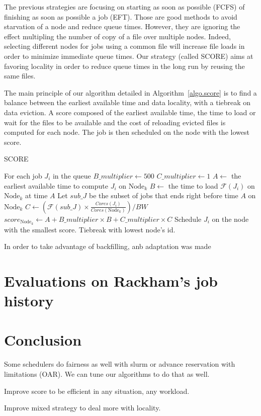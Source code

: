 \documentclass[conference,10pt]{IEEEtran}
\newcommand{\Node}[1]{\ensuremath{\mathrm{Node}_{#1}}\xspace}
\newcommand{\inputs}{\ensuremath{\mathcal{F}}\xspace}
\newcommand{\memory}{\ensuremath{\mathcal{M}}\xspace}
\newcommand{\bandwidth}{\mathit{BW}\xspace}
\newcommand{\core}{\mathit{Cores}\xspace}
\newcommand{\nodeset}{\ensuremath{\mathbb{N}}\xspace}
\begin{document}
The previous strategies are focusing on starting as soon as possible (FCFS)
of finishing as soon as possible a job (EFT).
Those are good methods to avoid starvation of a node and reduce queue times.
However, they are ignoring the effect multipling the number of copy of a file
over multiple nodes. Indeed, selecting different nodes for jobs using a common
file will increase file loads in order to minimize immediate queue times.
Our strategy (called SCORE) aims at favoring locality in order to reduce
queue times in the long run by reusing the same files. 

The main principle of our algorithm detailed in Algorithm~\ref{algo.score} 
is to find a balance between the earliest available time and data locality,
with a tiebreak on data eviction. A score composed of the earliest available 
time, the time to load or wait for the files to be available and the cost of 
reloading evicted files is computed for each node. The job is then scheduled
on the node with the lowest score.

\begin{algorithm}[htbp]\caption{SCORE}\label{algo.score}\begin{algorithmic}[1]
	\Statex For each job $J_i$ in the queue
	\State $B\_multiplier \gets 500$
	\State $C\_multiplier \gets 1$
	\ForEach {$\Node{k} \in \nodeset$}
		\State $A \gets$ the earliest available time to compute $J_i$ on $\Node{k}$
		\State $B \gets$ the time to load $\inputs(J_i)$ on $\Node{k}$ at time $A$ 
		\State Let $\mathit{sub\_J}$ be the subset of jobs that ends right before time $A$ on $\Node{k}$
		\State $C \gets (\inputs(\mathit{sub\_J}) \times \frac{\core(J_i)}{\core(\Node{k})})/\bandwidth$
		\State $score_{\Node{k}} \gets A + B\_multiplier \times B + C\_multiplier \times C$
	\EndFor
	\State Schedule $J_i$ on the node with the smallest score. Tiebreak with lowest node's id.
\end{algorithmic}\end{algorithm}

In order to take advantage of backfilling, anb adaptation was made

\section{Evaluations on Rackham's job history}\label{sec.evaluations}

\section{Conclusion}\label{sec.conclusion}

Some schedulers do fairness as well with slurm or advance reservation with limitations (OAR).
We can tune our algorithms to do that as well.

Improve score to be efficient in any situation, any workload.

Improve mixed strategy to deal more with locality.




\end{document}
